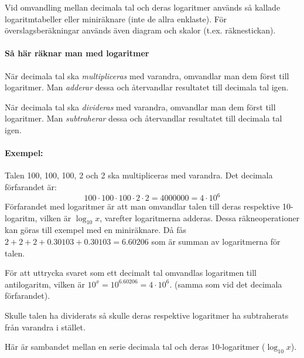 Vid omvandling mellan decimala tal och deras logaritmer används så kallade
logaritmtabeller eller miniräknare (inte de allra enklaste).
För överslagsberäkningar används även diagram och skalor (t.ex. räknestickan).

\paragraph{Så här räknar man med logaritmer}

När decimala tal ska \emph{multipliceras} med varandra, omvandlar man dem
först till logaritmer.
Man \emph{adderar} dessa och återvandlar resultatet till decimala tal igen.

När decimala tal ska \emph{divideras} med varandra, omvandlar man dem först
till logaritmer.
Man \emph{subtraherar} dessa och återvandlar resultatet till decimala tal igen.

\paragraph{Exempel:}

Talen 100, 100, 100, 2 och 2 ska multipliceras med varandra.
Det decimala förfarandet är:
\[100 \cdot 100 \cdot 100 \cdot 2 \cdot 2 = 4000000 = 4 \cdot 10^6\]
Förfarandet med logaritmer är att man omvandlar talen till deras respektive
10-logaritm, vilken är \(\log_{10} x\), varefter logaritmerna adderas.
Dessa räkneoperationer kan göras till exempel med en miniräknare.
Då fås \(2 + 2 + 2 + 0.30103 + 0.30103 = 6.60206\) som är summan av
logaritmerna för talen.

För att uttrycka svaret som ett decimalt tal omvandlas logaritmen till
antilogaritm, vilken är \(10^x = 10^{6.60206} = 4 \cdot 10^6\).
(samma som vid det decimala förfarandet).

Skulle talen ha dividerats så skulle deras respektive logaritmer ha subtraherats
från varandra i stället.

Här är sambandet mellan en serie decimala tal och deras 10-logaritmer
(\(\log_{10} x\)).

